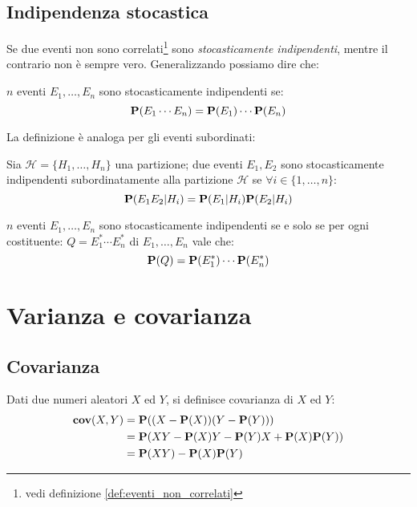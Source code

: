 \subsection{Indipendenza stocastica} %
Se due eventi non sono correlati\footnote{vedi definizione \ref{def:eventi_non_correlati}} sono \emph{stocasticamente indipendenti}, mentre il contrario non è sempre vero.
Generalizzando possiamo dire che:
\begin{definition}
  $n$ eventi \( E_1, \ldots, E_n \) sono stocasticamente indipendenti se:
  \[ \mathbf{P}(E_1 \cdots E_n) = \mathbf{P}(E_1) \cdots \mathbf{P}(E_n) \]
\end{definition}

La definizione è analoga per gli eventi subordinati:
\begin{definition}
  Sia \( \mathcal{H} = \{ H_1, \ldots, H_n \} \) una partizione; due eventi \( E_1, E_2 \) sono stocasticamente indipendenti subordinatamente alla partizione \( \mathcal{H} \) se \( \forall i \in \{1,\ldots,n\} \):
  \[ \mathbf{P}(E_1 E_2 | H_i) = \mathbf{P}(E_1 | H_i)\mathbf{P}(E_2|H_i) \]
\end{definition}

\begin{definition}
  $n$ eventi \( E_1, \ldots, E_n \) sono stocasticamente indipendenti se e solo se per ogni costituente:
  \( Q = E_1^* \cdots E_n^* \) di \( E_1, \ldots, E_n \) vale che:
  \[ \mathbf{P}(Q) = \mathbf{P}(E_1^*) \cdots \mathbf{P}(E_n^*) \]
\end{definition}


\section{Varianza e covarianza} %
\subsection{Covarianza} %
\begin{definition}[Covarianza]\label{def:covarianza}
  Dati due numeri aleatori $X$ ed $Y$, si definisce covarianza di $X$ ed $Y$:
  \begin{align*}
    \mathbf{cov}(X,Y) &= \mathbf{P}((X - \mathbf{P}(X))(Y - \mathbf{P}(Y))) \\
    &= \mathbf{P}(XY - \mathbf{P}(X)Y - \mathbf{P}(Y)X + \mathbf{P}(X)\mathbf{P}(Y)) \\
    &= \mathbf{P}(XY) - \mathbf{P}(X)\mathbf{P}(Y)
  \end{align*}
\end{definition}

